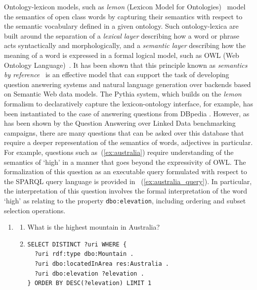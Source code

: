 \documentclass[11pt]{article}
\begin{document}
Ontology-lexicon models, such as \emph{lemon} (Lexicon Model for Ontologies)~
\cite{mccrae2012inter} model the semantics of open class words by capturing their semantics with respect to the semantic vocabulary defined in a given ontology. Such 
ontology-lexica are built around the separation of a \emph{lexical layer} describing 
how a word or phrase acts syntactically and morphologically, and a \emph{semantic layer} 
describing how the meaning of a word is expressed in a formal logical model, 
such as OWL (Web Ontology Language)~\cite{mcguinness2004owl}. It has been 
shown that this principle known as \emph{semantics by reference}~
\cite{buitelaar2010ontology} is an effective model that can support the task of developing
question answering systems \cite{unger2011pythia} and natural language 
generation \cite{cimiano2013exploiting} over backends based on Semantic Web data models.
The Pythia system, which builds on the \emph{lemon} formalism to declaratively capture the lexicon-ontology interface, for example, has been instantiated to the case of answering questions from DBpedia \cite{unger2011pythia}.
However, as has been 
shown by the Question Answering over Linked Data \cite[QALD]{lopez2013evaluating}
benchmarking campaigns, there are many questions that can be asked over this database that require 
a deeper representation of the semantics of words, adjectives in particular. For example, 
questions such as~(\ref{ex:australia}) require understanding of the semantics of `high' in a manner that goes beyond the expressivity of OWL. The formalization of this question as an executable query formulated with respect to the SPARQL query language is provided in ~(\ref{ex:australia_query}). 
In particular, the interpretation of this question involves the formal interpretation of the word `high' as relating to the property {\tt dbo:elevation}, including ordering 
and subset selection operations.

\begin{enumerate}
\item \begin{enumerate} 
\item What is the highest mountain in Australia? \label{ex:australia}
\item \begin{small}\begin{small}\begin{verbatim}
SELECT DISTINCT ?uri WHERE { 
  ?uri rdf:type dbo:Mountain . 
  ?uri dbo:locatedInArea res:Australia . 
  ?uri dbo:elevation ?elevation . 
} ORDER BY DESC(?elevation) LIMIT 1
\end{verbatim}\end{small} \end{small}
\label{ex:australia_query}
\end{enumerate}
\end{enumerate}
\end{document}
